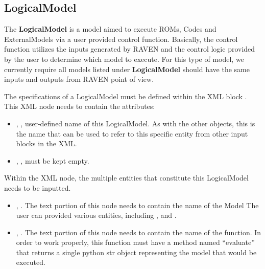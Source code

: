 %
%

\subsection{LogicalModel}
\label{subsec:models_LogicalModel}
The \textbf{LogicalModel} is a model aimed to execute ROMs,
Codes and ExternalModels via a user provided control function. Basically, the control function
utilizes the inputs generated by RAVEN and the control logic provided by the user to determine which
model to execute.
\nb For this type of model, we currently require all models listed under \textbf{LogicalModel} should
have the same inputs and outputs from RAVEN point of view.

The specifications of a LogicalModel must be defined within the XML block
.
%
This XML node needs to contain the attributes:

\vspace{-5mm}
\begin{itemize}
  \itemsep0em
  \item {}, , user-defined name
  of this LogicalModel.
  \nb As with the other objects, this is the name that can be used to refer to
  this specific entity from other input blocks in the XML.
  \item {}, , must be kept
  empty.
\end{itemize}
\vspace{-5mm}

Within the  XML node, the multiple entities that constitute
this LogicalModel needs to be inputted.

\begin{itemize}
  \item {}, .
  The text portion of this node needs to contain the name of the Model
  \nb The user can provided various  entities, including ,
   and .

  \item {}, .
  The text portion of this node needs to contain the name of the function.
  \nb In order to work properly, this function must have a method named ``evaluate''
  that returns a single python str object representing the model that would be
  executed.
\end{itemize}

